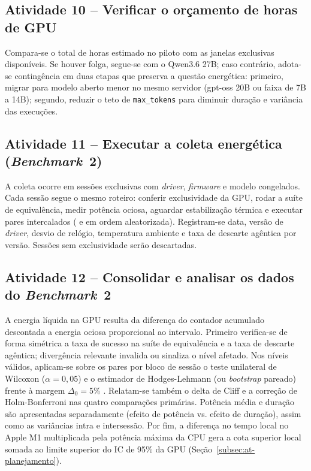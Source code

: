 \subsection{Atividade 10 -- Verificar o orçamento de horas de GPU}
\label{subsec:at-orcamento}

Compara-se o total de horas estimado no piloto com as janelas exclusivas
disponíveis. Se houver folga, segue-se com o Qwen3.6 27B; caso contrário,
adota-se contingência em duas etapas que preserva a questão energética:
primeiro, migrar para modelo aberto menor no mesmo servidor (gpt-oss 20B ou
faixa de 7B a 14B); segundo, reduzir o teto de \texttt{max\_tokens} para
diminuir duração e variância das execuções.

\subsection{Atividade 11 -- Executar a coleta energética (\textit{Benchmark}~2)}
\label{subsec:at-coleta}

A coleta ocorre em sessões exclusivas com \textit{driver}, \textit{firmware} e
modelo congelados. Cada sessão segue o mesmo roteiro: conferir exclusividade da
GPU, rodar a suíte de equivalência, medir potência ociosa, aguardar
estabilização térmica e executar pares intercalados (\versaoH{} e \versaoD{} em
ordem aleatorizada). Registram-se data, versão de \textit{driver}, desvio de
relógio, temperatura ambiente e taxa de descarte agêntica por versão. Sessões
sem exclusividade serão descartadas.

\subsection{Atividade 12 -- Consolidar e analisar os dados do \textit{Benchmark}~2}
\label{subsec:at-analise-b2}

A energia líquida na GPU resulta da diferença do contador acumulado descontada a
energia ociosa proporcional ao intervalo. Primeiro verifica-se de forma
simétrica a taxa de sucesso na suíte de equivalência e a taxa de descarte
agêntica; divergência relevante invalida ou sinaliza o nível afetado. Nos níveis válidos, aplicam-se sobre os pares por bloco de sessão o teste
unilateral de Wilcoxon \cite{wilcoxon1945} ($\alpha = 0{,}05$) e o estimador de
Hodges-Lehmann \cite{hodges1963} (ou \textit{bootstrap} pareado) frente à margem
$\Delta_0 = 5\%$ \cite{wellek2010}. Relatam-se também o delta de Cliff
\cite{cliff1993,romano2006} e a correção de Holm-Bonferroni \cite{holm1979} nas
quatro comparações primárias. Potência média e duração são apresentadas
separadamente (efeito de potência vs. efeito de duração), assim como as
variâncias intra e intersessão.
Por fim, a diferença no tempo local no Apple M1 multiplicada pela potência
máxima da CPU gera a cota superior local somada ao limite superior do IC de
95\% da GPU (Seção~\ref{subsec:at-planejamento}).

